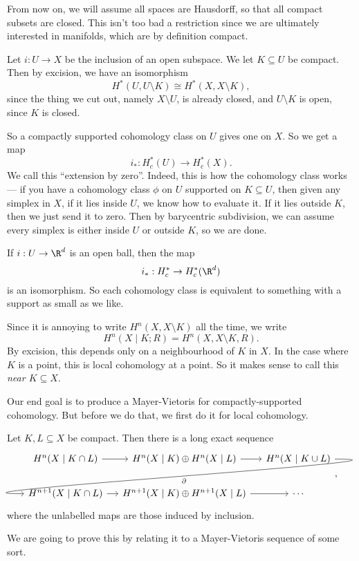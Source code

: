 \documentclass[a4paper]{article}
\begin{document}
From now on, we will assume all spaces are Hausdorff, so that all compact subsets are closed. This isn't too bad a restriction since we are ultimately interested in manifolds, which are by definition compact.

Let $i: U \to X$ be the inclusion of an open subspace. We let $K \subseteq U$ be compact. Then by excision, we have an isomorphism
\[
  H^*(U, U \setminus K) \cong H^*(X, X \setminus K),
\]
since the thing we cut out, namely $X \setminus U$, is already closed, and $U \setminus K$ is open, since $K$ is closed.

So a compactly supported cohomology class on $U$ gives one on $X$. So we get a map
\[
  i_*: H_c^*(U) \to H_c^*(X).
\]
We call this ``extension by zero''. Indeed, this is how the cohomology class works --- if you have a cohomology class $\phi$ on $U$ supported on $K \subseteq U$, then given any simplex in $X$, if it lies inside $U$, we know how to evaluate it. If it lies outside $K$, then we just send it to zero. Then by barycentric subdivision, we can assume every simplex is either inside $U$ or outside $K$, so we are done.

\begin{eg}
  If $i: U \to \R^d$ is an open ball, then the map
  \[
    i_*: H_c^* \to H_c^*(\R^d)
  \]
  is an isomorphism. So each cohomology class is equivalent to something with a support as small as we like.
\end{eg}

Since it is annoying to write $H^n(X, X \setminus K)$ all the time, we write
\[
  H^n(X\mid K; R) = H^n(X, X \setminus K, R).
\]
By excision, this depends only on a neighbourhood of $K$ in $X$. In the case where $K$ is a point, this is local cohomology at a point. So it makes sense to call this  \emph{near $K \subseteq X$}.

Our end goal is to produce a Mayer-Vietoris for compactly-supported cohomology. But before we do that, we first do it for local cohomology.

\begin{prop}
  Let $K, L \subseteq X$ be compact. Then there is a long exact sequence
  \[
    \begin{tikzcd}[column sep=small]
      H^n(X \mid K \cap L) \ar[r] & H^n(X \mid K) \oplus H^n(X \mid L) \ar[r] & H^n(X \mid K \cup L) \ar[out=0, in=180, overlay, lld, "\partial"]\\
      H^{n + 1}(X \mid K \cap L) \ar[r] & H^{n + 1}(X \mid K) \oplus H^{n + 1}(X \mid L) \ar[r] & \cdots
    \end{tikzcd},
  \]
  where the unlabelled maps are those induced by inclusion.
\end{prop}
We are going to prove this by relating it to a Mayer-Vietoris sequence of some sort.
\end{document}
